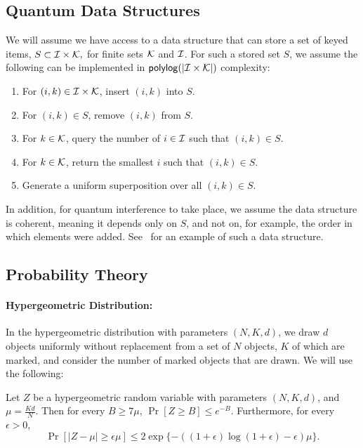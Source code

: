 \documentclass{theoretics}
\renewcommand{\>}{\rangle}
\newcommand{\<}{\langle}
\renewcommand{\(}{\left(}
\renewcommand{\)}{\right)}
\begin{document}
\subsection{Quantum Data Structures}\label{sec:data}

We will assume we have access to a data structure that can store a set of keyed items,
$S\subset {\cal I}\times {\cal K},$
for finite sets ${\cal K}$ and ${\cal I}$. For such a stored set $S$, we assume the following can be implemented in ${\sf polylog}(|{\cal I}\times {\cal K}|)$ complexity:
\begin{enumerate}
\item For $(i,k)\in {\cal I}\times {\cal K}$, insert $(i,k)$ into $S$.
\item For $(i,k)\in S$, remove $(i,k)$ from $S$.
\item For $k\in {\cal K}$, query the number of $i\in {\cal I}$ such that $(i,k)\in S$.
\item For $k\in{\cal K}$, return the smallest $i$ such that $(i,k)\in S$.
\item Generate a uniform superposition over all $(i,k)\in S$.  
\end{enumerate}

In addition, for quantum interference to take place, we assume the data structure is coherent, meaning it depends only on $S$, and not on, for example, the order in which elements were added. See~\cite[Section 3.1]{buhrman2022limits} for an example of such a data structure.


\subsection{Probability Theory}\label{sec:prelim-prob}

\paragraph{Hypergeometric Distribution:} In the hypergeometric distribution with parameters $(N,K,d)$, we draw $d$ objects uniformly without replacement from a set of $N$ objects, $K$ of which are marked, and consider the number of marked objects that are drawn.  We will use the following:
\begin{lemma}\label{lem:hypergeo}
Let $Z$ be a hypergeometric random variable with parameters $(N,K,d)$, and $\mu=\frac{Kd}{N}$. Then for every $B\geq 7\mu$, $\Pr[Z\geq B]\leq e^{-B}$. Furthermore, for every $\epsilon>0$, 
$$\Pr[|Z-\mu|\geq \epsilon\mu]\leq 2\exp\{-((1+\epsilon)\log(1+\epsilon)-\epsilon)\mu\}.$$
\end{lemma}
\end{document}
